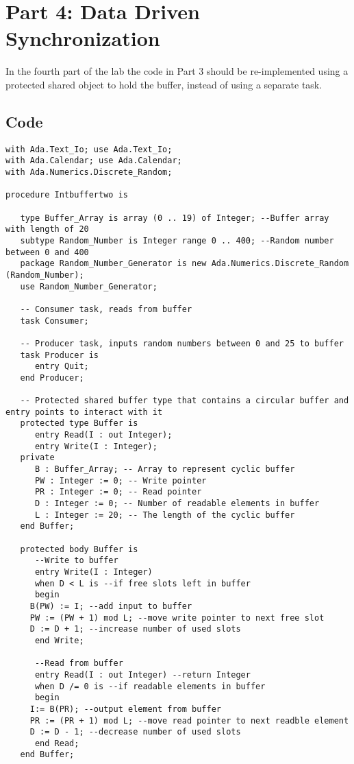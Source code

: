 \documentclass[a4paper,10pt]{article}
\begin{document}
\section{Part 4: Data Driven Synchronization}

In the fourth part of the lab the code in Part 3 should be re-implemented using a protected shared object to hold the buffer, instead of using a separate task.

\subsection{Code}

\begin{lstlisting}
with Ada.Text_Io; use Ada.Text_Io;
with Ada.Calendar; use Ada.Calendar;
with Ada.Numerics.Discrete_Random;

procedure Intbuffertwo is
   
   type Buffer_Array is array (0 .. 19) of Integer; --Buffer array with length of 20
   subtype Random_Number is Integer range 0 .. 400; --Random number between 0 and 400
   package Random_Number_Generator is new Ada.Numerics.Discrete_Random (Random_Number);
   use Random_Number_Generator;
   
   -- Consumer task, reads from buffer
   task Consumer;
   
   -- Producer task, inputs random numbers between 0 and 25 to buffer
   task Producer is 
      entry Quit;
   end Producer;   
   
   -- Protected shared buffer type that contains a circular buffer and entry points to interact with it   
   protected type Buffer is
      entry Read(I : out Integer);
      entry Write(I : Integer);
   private
      B : Buffer_Array; -- Array to represent cyclic buffer
      PW : Integer := 0; -- Write pointer
      PR : Integer := 0; -- Read pointer
      D : Integer := 0; -- Number of readable elements in buffer
      L : Integer := 20; -- The length of the cyclic buffer
   end Buffer;
   
   protected body Buffer is
      --Write to buffer
      entry Write(I : Integer) 
      when D < L is --if free slots left in buffer
      begin
	 B(PW) := I; --add input to buffer
	 PW := (PW + 1) mod L; --move write pointer to next free slot
	 D := D + 1; --increase number of used slots
      end Write;
      
      --Read from buffer
      entry Read(I : out Integer) --return Integer
      when D /= 0 is --if readable elements in buffer
      begin
	 I:= B(PR); --output element from buffer
	 PR := (PR + 1) mod L; --move read pointer to next readble element
	 D := D - 1; --decrease number of used slots
      end Read;	 
   end Buffer;
   

\end{lstlisting}
\end{document}
